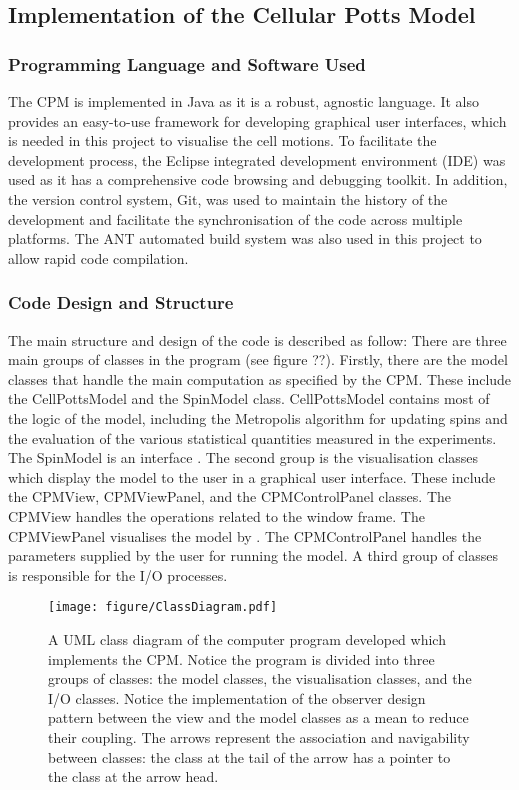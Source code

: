 \documentclass[a4paper,12pt]{article}
\begin{document}
\subsection{Implementation of the Cellular Potts Model}
\subsubsection{Programming Language and Software Used}
The CPM is implemented in Java as it is a robust, agnostic language. It also provides an easy-to-use framework for developing graphical user interfaces, which is needed in this project to visualise the cell motions. To facilitate the development process, the Eclipse integrated development environment (IDE) was used as it has a comprehensive code browsing and debugging toolkit. In addition, the version control system, Git, was used to maintain the history of the development and facilitate the synchronisation of the code across multiple platforms. The ANT automated build system was also used in this project to allow rapid code compilation.

\subsubsection{Code Design and Structure}
The main structure and design of the code is described as follow: There are three main groups of classes in the program (see figure ??). Firstly, there are the model classes that handle the main computation as specified by the CPM. These include the CellPottsModel and the SpinModel class. CellPottsModel contains most of the logic of the model, including the Metropolis algorithm for updating spins and the evaluation of the various statistical quantities measured in the experiments. The SpinModel is an interface  . The second group is the visualisation classes which display the model to the user in a graphical user interface. These include the CPMView, CPMViewPanel, and the CPMControlPanel classes. The CPMView handles the operations related to the window frame. The CPMViewPanel visualises the model by . The CPMControlPanel handles the parameters supplied by the user for running the model.  A third group of classes is responsible for the I/O processes. 

\begin{figure}[h]
\texttt{[image: figure/ClassDiagram.pdf]}
\caption{A UML class diagram of the computer program developed which implements the CPM. Notice the program is divided into three groups of classes: the model classes, the visualisation classes, and the I/O classes. Notice the implementation of the observer design pattern between the view and the model classes as a mean to reduce their coupling. The arrows represent the association and navigability between classes: the class at the tail of the arrow has a pointer to the class at the arrow head.}
\label{fig:ClassDiagram}
\end{figure}
\end{document}
